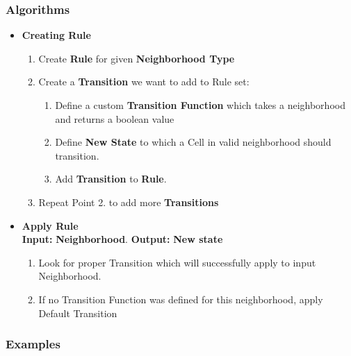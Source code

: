 \documentclass{article}
\begin{document}
\subsubsection{Algorithms}
\begin{itemize}
\item {\bf Creating Rule}
	\begin{enumerate}
		\item Create {\bf Rule} for given {\bf Neighborhood Type}
		\item Create a {\bf Transition} we want to add to Rule set:
			\begin{enumerate}
				\item Define a custom {\bf Transition Function} which takes a 
				neighborhood and returns a boolean value			
				\item Define {\bf New State} to which a Cell in valid neighborhood should transition.
				\item Add {\bf Transition} to {\bf Rule}.
			\end{enumerate}
		\item Repeat Point 2. to add more {\bf Transitions}
	\end{enumerate}

\item {\bf Apply Rule}\\
	{\bf Input:} {\bf Neighborhood}. 
	{\bf Output:} {\bf New state}
	\begin{enumerate}
		\item Look for proper Transition which will successfully apply to input 
		Neighborhood.
		\item If no Transition Function was defined for this neighborhood, apply Default Transition
	\end{enumerate}

\end{itemize}

\newpage

\subsubsection{Examples}
\end{document}
